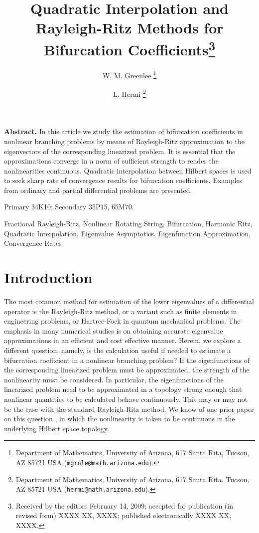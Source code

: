 \documentclass[final]{siamltex}
\title{Quadratic Interpolation and Rayleigh-Ritz Methods for Bifurcation Coefficients\thanks{
Received by the editors February 14, 2009; accepted for publication (in revised form) XXXX XX, XXXX; published electronically XXXX XX, XXXX.
}}
\author{W. M. Greenlee
\thanks{Department of Mathematics,
University of Arizona,
617 Santa Rita, Tucson, AZ 85721 USA
({\tt mgrnle@math.arizona.edu}).}
\and L. Hermi
\thanks{Department of Mathematics,
University of Arizona,
617 Santa Rita, Tucson, AZ 85721 USA
({\tt hermi@math.arizona.edu}).}
}
\numberwithin{equation}{section}
\begin{document}
\maketitle

\medskip

{\bf Abstract.} In this article we study the estimation of bifurcation coefficients in nonlinear branching problems by means of Rayleigh-Ritz approximation to the eigenvectors of the corresponding linearized problem. It is essential that the approximations converge in a norm of sufficient strength to render the nonlinearities continuous. Quadratic interpolation between Hilbert spaces is used to seek sharp rate of convergence results for bifurcation coefficients. Examples from ordinary and partial differential problems are presented.

\medskip

\begin{AMS}
Primary 34K10;
Secondary 35P15, 65M70.
\end{AMS}

\medskip

\begin{keywords}
Fractional Rayleigh-Ritz, Nonlinear Rotating String, Bifurcation, Harmonic Ritz, Quadratic Interpolation, Eigenvalue Asymptotics, Eigenfunction Approximation, Convergence Rates
\end{keywords}

\newpage

\thispagestyle{plain}

\section{Introduction} \label{intro}

The most common method for estimation of the lower eigenvalues of a differential operator is the Rayleigh-Ritz method, or a variant such as finite elements in engineering problems, or Hartree-Fock in quantum mechanical problems. The emphasis in many numerical studies is on obtaining accurate eigenvalue approximations in an efficient and cost effective manner. Herein, we explore a different question, namely, is the calculation useful if needed to estimate a bifurcation coefficient in a nonlinear branching problem? If the eigenfunctions of the corresponding linearized problem must be approximated, the strength of the nonlinearity must be considered. In particular, the eigenfunctions of the linearized problem need to be approximated in a topology strong enough that nonlinear quantities to be calculated behave continuously. This may or may not be the case with the standard Rayleigh-Ritz method. We know of one prior paper on this question \cite{Bazley-Zwahlen}, in which the nonlinearity is taken to be continuous in the underlying Hilbert space topology.
\end{document}
